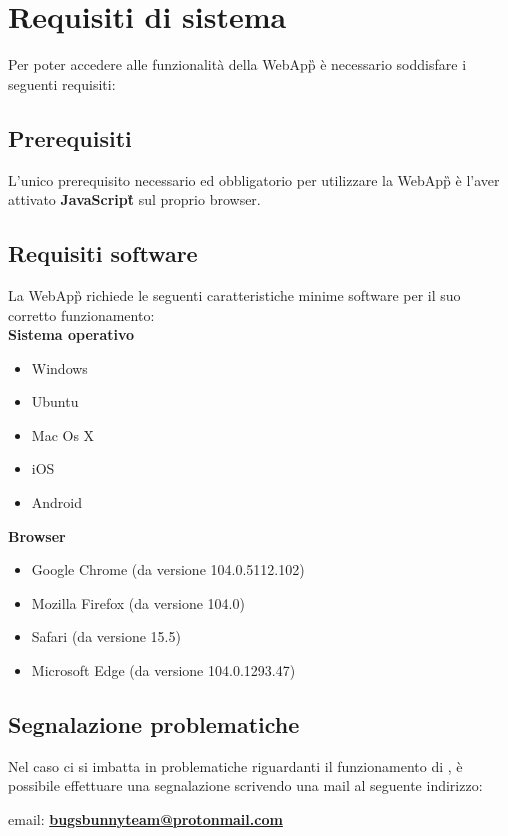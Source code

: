 \section{Requisiti di sistema}
Per poter accedere alle funzionalità della WebApp\G{} è necessario soddisfare i seguenti requisiti:

\subsection{Prerequisiti}
L'unico prerequisito necessario ed obbligatorio per utilizzare la WebApp\G{} \platform{} è l'aver attivato \textbf{JavaScript}\G{} sul proprio browser.

\subsection{Requisiti software}
La WebApp\G{} \platform{} richiede le seguenti caratteristiche minime software per il suo corretto funzionamento:\\

\textbf{Sistema operativo}
\begin{itemize}
    \item Windows
    \item Ubuntu 
    \item Mac Os X
    \item iOS
    \item Android
\end{itemize}

\textbf{Browser}
\begin{itemize}
    \item Google Chrome (da versione 104.0.5112.102)
    \item Mozilla Firefox (da versione 104.0)
    \item Safari (da versione 15.5)
    \item Microsoft Edge (da versione 104.0.1293.47)
\end{itemize}

\subsection{Segnalazione problematiche}
Nel caso ci si imbatta in problematiche riguardanti il funzionamento di \platform, è possibile
effettuare una segnalazione scrivendo una mail al seguente indirizzo:\\


\begin{center}
email: \textbf{\href{mailto:bugsbunnyteam@protonmail.com}{bugsbunnyteam@protonmail.com} }
\end{center}
